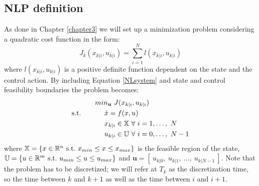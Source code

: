 \subsection{NLP definition}

As done in Chapter \ref{chapter3} we will set up a minimization problem considering a quadratic cost function in the form:
\begin{equation}
J_{k}({x}_{k|i},{u}_{k|i})=\sum_{i=1}^{N}l({x}_{k|i},{u}_{k|i})
\end{equation} 
where $l({x}_{k|i},{u}_{k|i})$ is a positive definite function dependent on the state and the control action. By including Equation \ref{NLsystem} and state and control feasibility boundaries the problem becomes: 
\begin{equation} \label{ourproblem_basic}
\begin{split}
		& min_{\textbf{u}}\ J({x}_{k|i},{u}_{k|i}) \\
		\textnormal{s.t.}\qquad
		&\ \ \ \ \dot{{x}}=f({x},{u}) \\
		&\ \ \ \ {x}_{k|i} \in \mathbb{X}\ \forall\ i=1,\dots,\ N  \\
		&\ \ \ \ {u}_{k|i} \in \mathbb{U}\ \forall\ i=0,\dots,\ N-1 \\
	\end{split}	
\end{equation}
where $\mathbb{X} = \lbrace {x}\in \mathbb{R}^n\ \textnormal{s.t.}\ {x}_{min}\leq x\leq x_{max} \rbrace$ is the feasible region of the state, $\mathbb{U} = \lbrace {u}\in \mathbb{R}^m\ \textnormal{s.t.}\ {u}_{min}\leq{u}\leq{u}_{max} \rbrace $ and $\textbf{u}=[\ u_{k|0},\ u_{k|1},\ \dots,\ u_{k|N-1}\ ]$.
Note that the problem has to be discretized; we will refer at $T_k$ as the discretization time, so the time between $k$ and $k+1$ as well as the time between $i$ and $i+1$.
